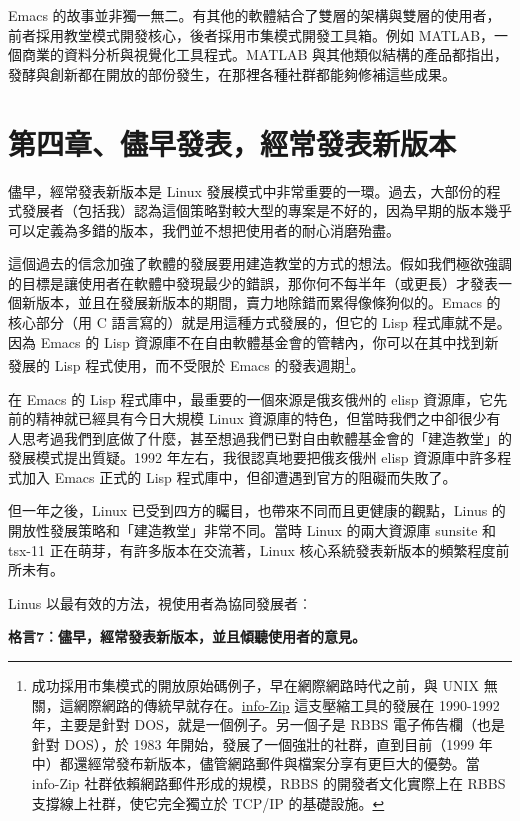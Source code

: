 \documentclass[10pt, b5paper]{book}
\begin{document}
Emacs
的故事並非獨一無二。有其他的軟體結合了雙層的架構與雙層的使用者，前者採用教堂模式開發核心，後者採用市集模式開發工具箱。例如
MATLAB，一個商業的資料分析與視覺化工具程式。MATLAB
與其他類似結構的產品都指出，發酵與創新都在開放的部份發生，在那裡各種社群都能夠修補這些成果。

\newpage
\section{第四章、儘早發表，經常發表新版本}

儘早，經常發表新版本是 Linux
發展模式中非常重要的一環。過去，大部份的程式發展者（包括我）認為這個策略對較大型的專案是不好的，因為早期的版本幾乎可以定義為多錯的版本，我們並不想把使用者的耐心消磨殆盡。

這個過去的信念加強了軟體的發展要用建造教堂的方式的想法。假如我們極欲強調的目標是讓使用者在軟體中發現最少的錯誤，那你何不每半年（或更長）才發表一個新版本，並且在發展新版本的期間，賣力地除錯而累得像條狗似的。Emacs
的核心部分（用 C 語言寫的）就是用這種方式發展的，但它的 Lisp
程式庫就不是。因為 Emacs 的 Lisp
資源庫不在自由軟體基金會的管轄內，你可以在其中找到新發展的 Lisp
程式使用，而不受限於 Emacs 的發表週期\footnote{成功採用市集模式的開放原始碼例子，早在網際網路時代之前，與
  UNIX
  無關，這網際網路的傳統早就存在。\href{http://www.cdrom.com/pub/infozip/}{info-Zip}
  這支壓縮工具的發展在 1990-1992 年，主要是針對
  DOS，就是一個例子。另一個子是 RBBS 電子佈告欄（也是針對 DOS），於 1983
  年開始，發展了一個強壯的社群，直到目前（1999
  年中）都還經常發布新版本，儘管網路郵件與檔案分享有更巨大的優勢。當
  info-Zip 社群依賴網路郵件形成的規模，RBBS 的開發者文化實際上在 RBBS
  支撐線上社群，使它完全獨立於 TCP/IP 的基礎設施。}。

在 Emacs 的 Lisp 程式庫中，最重要的一個來源是俄亥俄州的 elisp
資源庫，它先前的精神就已經具有今日大規模 Linux
資源庫的特色，但當時我們之中卻很少有人思考過我們到底做了什麼，甚至想過我們已對自由軟體基金會的「建造教堂」的發展模式提出質疑。1992
年左右，我很認真地要把俄亥俄州 elisp 資源庫中許多程式加入 Emacs 正式的
Lisp 程式庫中，但卻遭遇到官方的阻礙而失敗了。

但一年之後，Linux 已受到四方的矚目，也帶來不同而且更健康的觀點，Linus
的開放性發展策略和「建造教堂」非常不同。當時 Linux 的兩大資源庫 sunsite
和 tsx-11 正在萌芽，有許多版本在交流著，Linux
核心系統發表新版本的頻繁程度前所未有。

Linus 以最有效的方法，視使用者為協同發展者︰

\textbf{格言7︰儘早，經常發表新版本，並且傾聽使用者的意見。}
\end{document}

